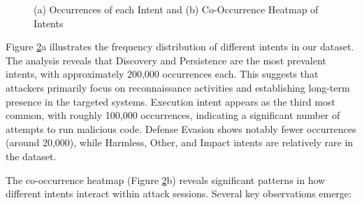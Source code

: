 \begin{figure}[h]
\begin{subfigure}[c]{0.47\textwidth}
                \label{fig:co-occurrence-heatmap-of-intents}
            \end{subfigure}
            \vspace{-0.5cm}
            \caption{(a) Occurrences of each Intent and (b) Co-Occurrence Heatmap of Intents}
            \label{fig:occurrences-and-co-occurrences-intents}
        \end{figure}

        

        Figure \ref{fig:occurrences-and-co-occurrences-intents}a illustrates the frequency distribution of different intents in our dataset. The analysis reveals that Discovery and Persistence are the most prevalent intents, with approximately 200,000 occurrences each. This suggests that attackers primarily focus on reconnaissance activities and establishing long-term presence in the targeted systems. Execution intent appears as the third most common, with roughly 100,000 occurrences, indicating a significant number of attempts to run malicious code. Defense Evasion shows notably fewer occurrences (around 20,000), while Harmless, Other, and Impact intents are relatively rare in the dataset.

        The co-occurrence heatmap (Figure \ref{fig:occurrences-and-co-occurrences-intents}b) reveals significant patterns in how different intents interact within attack sessions. Several key observations emerge:

